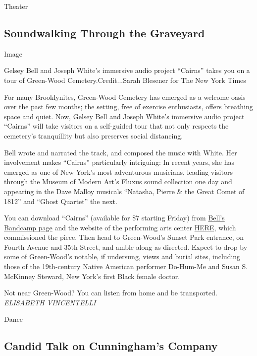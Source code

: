 Theater

\hypertarget{soundwalking-through-the-graveyard}{%
\subsection{Soundwalking Through the
Graveyard}\label{soundwalking-through-the-graveyard}}

Image

Gelsey Bell and Joseph White's immersive audio project ``Cairns'' takes
you on a tour of Green-Wood Cemetery.Credit...Sarah Blesener for The New
York Times

For many Brooklynites, Green-Wood Cemetery has emerged as a welcome
oasis over the past few months; the setting, free of exercise
enthusiasts, offers breathing space and quiet. Now, Gelsey Bell and
Joseph White's immersive audio project ``Cairns'' will take visitors on
a self-guided tour that not only respects the cemetery's tranquillity
but also preserves social distancing.

Bell wrote and narrated the track, and composed the music with White.
Her involvement makes ``Cairns'' particularly intriguing: In recent
years, she has emerged as one of New York's most adventurous musicians,
leading visitors through the Museum of Modern Art's Fluxus sound
collection one day and appearing in the Dave Malloy musicals ``Natasha,
Pierre \& the Great Comet of 1812'' and ``Ghost Quartet'' the next.

You can download ``Cairns'' (available for \$7 starting Friday) from
\href{https://gelseybell.bandcamp.com/album/cairns}{Bell's Bandcamp
page} and the website of the performing arts center
\href{http://here.org/events/}{HERE}, which commissioned the piece. Then
head to Green-Wood's Sunset Park entrance, on Fourth Avenue and 35th
Street, and amble along as directed. Expect to drop by some of
Green-Wood's notable, if undersung, views and burial sites, including
those of the 19th-century Native American performer Do-Hum-Me and Susan
S. McKinney Steward, New York's first Black female doctor.

Not near Green-Wood? You can listen from home and be transported.\\
\emph{ELISABETH VINCENTELLI}

Dance

\hypertarget{candid-talk-on-cunninghams-company}{%
\subsection{Candid Talk on Cunningham's
Company}\label{candid-talk-on-cunninghams-company}}

